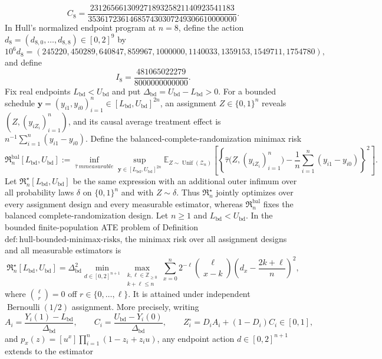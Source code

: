 \[
 C_8=\frac{23126566130927189325821140923541183}
 {353617236146857430307249306610000000}.
\]
In Hull's normalized endpoint program at \(n=8\), define the action \(d_8=(d_{8,0},\ldots,d_{8,8})\in[0,2]^9\) by
\[
 10^6d_8=(245220,450289,640847,859967,1000000,
 1140033,1359153,1549711,1754780),
\]
and define
\[
 I_8=\frac{481065022279}{8000000000000}.
\]
Fix real endpoints \(L_{\mathrm{bd}}<U_{\mathrm{bd}}\) and put \(\Delta_{\mathrm{bd}}=U_{\mathrm{bd}}-L_{\mathrm{bd}}>0\).  For a bounded schedule \(\mathbf y=(y_{i1},y_{i0})_{i=1}^n\in[L_{\mathrm{bd}},U_{\mathrm{bd}}]^{2n}\), an assignment \(Z\in\{0,1\}^n\) reveals \((Z,(y_{iZ_i})_{i=1}^n)\), and its causal average treatment effect is \(n^{-1}\sum_{i=1}^n(y_{i1}-y_{i0})\).  Define the balanced-complete-randomization minimax risk
\[
 \mathfrak R_n^{\mathrm{bal}}[L_{\mathrm{bd}},U_{\mathrm{bd}}]
 :=\inf_{\widehat\tau\ {
m measurable}}
 \sup_{\mathbf y\in[L_{\mathrm{bd}},U_{\mathrm{bd}}]^{2n}}
 \mathbb E_{Z\sim\operatorname{Unif}(\mathcal Z_n)}
 \left[\left\{\widehat\tau\bigl(Z,(y_{iZ_i})_{i=1}^n\bigr)
 -\frac1n\sum_{i=1}^n(y_{i1}-y_{i0})\right\}^2\right].
\]
Let \(\mathfrak R_n^\star[L_{\mathrm{bd}},U_{\mathrm{bd}}]\) be the same expression with an additional outer infimum over all probability laws \(\delta\) on \(\{0,1\}^n\) and with \(Z\sim\delta\).  Thus \(\mathfrak R_n^\star\) jointly optimizes over every assignment design and every measurable estimator, whereas \(\mathfrak R_n^{\mathrm{bal}}\) fixes the balanced complete-randomization design.
Let \(n\geq1\) and \(L_{\mathrm{bd}}<U_{\mathrm{bd}}\).  In the bounded finite-population ATE problem of Definition \(\mathrm{def{:}hull\mbox{-}bounded\mbox{-}minimax\mbox{-}risks}\), the minimax risk over all assignment designs and all measurable estimators is
\[
 \mathfrak R_n^\star[L_{\mathrm{bd}},U_{\mathrm{bd}}]
 =\Delta_{\mathrm{bd}}^2
 \min_{d\in[0,2]^{n+1}}
 \max_{\substack{k,\ell\in\mathbb Z_{\geq0}\\k+\ell\leq n}}
 \sum_{x=0}^n2^{-\ell}\binom{\ell}{x-k}
 \left(d_x-\frac{2k+\ell}{n}\right)^2,
\]
where \(\binom\ell r=0\) off \(r\in\{0,\ldots,\ell\}\).  It is attained under independent \(\operatorname{Bernoulli}(1/2)\) assignment.  More precisely, writing
\[
 A_i=\frac{Y_i(1)-L_{\mathrm{bd}}}{\Delta_{\mathrm{bd}}},\qquad
 C_i=\frac{U_{\mathrm{bd}}-Y_i(0)}{\Delta_{\mathrm{bd}}},\qquad
 Z_i^\circ=D_iA_i+(1-D_i)C_i\in[0,1],
\]
and \(p_x(z)=[u^x]\prod_{i=1}^n(1-z_i+z_i u)\), any endpoint action \(d\in[0,2]^{n+1}\) extends to the estimator
